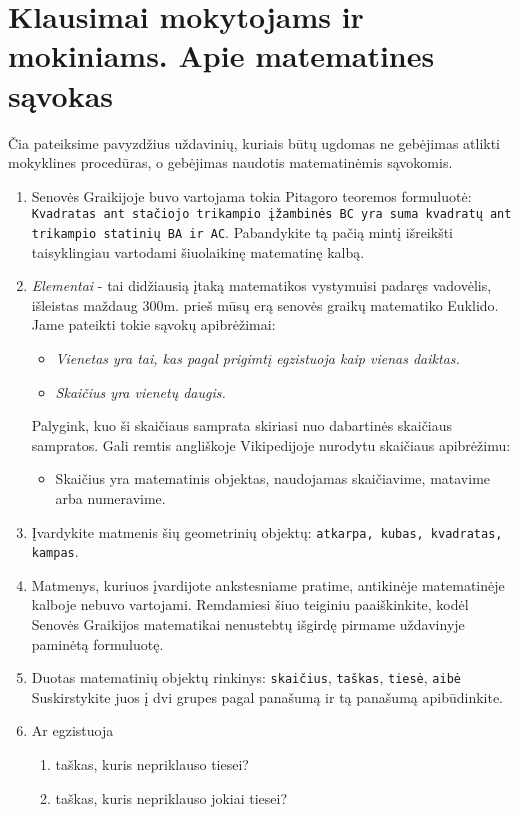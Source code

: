 \documentclass{article}
\begin{document}
\section*{Klausimai mokytojams ir mokiniams. Apie matematines sąvokas}
Čia pateiksime pavyzdžius uždavinių, kuriais būtų ugdomas ne gebėjimas atlikti mokyklines procedūras, o gebėjimas naudotis matematinėmis sąvokomis.
\begin{enumerate}
\item Senovės Graikijoje buvo vartojama tokia Pitagoro teoremos formuluotė: \texttt{Kvadratas ant stačiojo trikampio įžambinės BC yra suma kvadratų ant trikampio statinių BA ir AC}. Pabandykite tą pačią mintį išreikšti taisyklingiau vartodami šiuolaikinę matematinę kalbą.
\item \textit{Elementai} - tai didžiausią įtaką matematikos vystymuisi padaręs vadovėlis, išleistas maždaug 300m. prieš mūsų erą senovės graikų matematiko Euklido. Jame pateikti tokie sąvokų apibrėžimai:
\begin{itemize}
\item \textit{Vienetas yra tai, kas pagal prigimtį egzistuoja kaip vienas daiktas.}
\item \textit{Skaičius yra vienetų daugis.}
\end{itemize}
Palygink, kuo ši skaičiaus samprata skiriasi nuo dabartinės skaičiaus sampratos. Gali remtis angliškoje Vikipedijoje nurodytu skaičiaus apibrėžimu:
\begin{itemize}
\item Skaičius yra matematinis objektas, naudojamas skaičiavime, matavime arba numeravime.
\end{itemize}
\item Įvardykite matmenis šių geometrinių objektų: \texttt{atkarpa, kubas, kvadratas, kampas}.
\item Matmenys, kuriuos įvardijote ankstesniame pratime, antikinėje matematinėje kalboje nebuvo vartojami. Remdamiesi šiuo teiginiu paaiškinkite, kodėl Senovės Graikijos matematikai nenustebtų išgirdę pirmame uždavinyje paminėtą formuluotę.
\item Duotas matematinių objektų rinkinys: \texttt{skaičius}, \texttt{taškas}, \texttt{tiesė}, \texttt{aibė}
Suskirstykite juos į dvi grupes pagal panašumą ir tą panašumą apibūdinkite.
\item Ar egzistuoja
\begin{enumerate}
\item  taškas, kuris nepriklauso tiesei?
\item  taškas, kuris nepriklauso jokiai tiesei?

\end{enumerate}
\end{enumerate}
\end{document}
